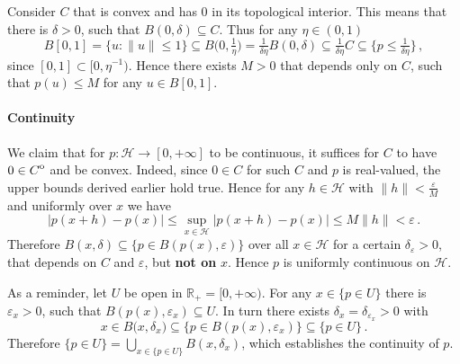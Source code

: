 \documentclass[a4paper]{article}
\newcommand{\Hcal}{\mathcal{H}}
\newcommand{\real}{\mathbb{R}}
\newcommand{\interior}[1]{%
  {\kern0pt#1}^{\mathrm{o}}%
}
\newcommand{\Tcal}{\mathcal{T}}
\begin{document}
Consider $C$ that is convex and has $0$ in its topological interior. This means that
there is $\delta > 0$, such that $B(0, \delta) \subseteq C$. Thus for any $\eta \in
(0, 1)$
\begin{equation*}
  B[0, 1]
    = \{u\colon \|u\| \leq 1\}
    \subseteq B\bigl( 0, \tfrac1\eta \bigr)
    = \tfrac1{\delta \eta} B(0, \delta)
    \subseteq \tfrac1{\delta \eta} C
    \subseteq \bigl\{p \leq \tfrac1{\delta\eta} \bigr\}
    \,,
\end{equation*}
since $[0, 1] \subset [0, \eta^{-1})$. Hence there exists $M > 0$ that depends only
on $C$, such that $p(u) \leq M$ for any $u \in B[0, 1]$.


\paragraph{Continuity} %
\label{par:continuity}

We claim that for $p\colon \Hcal \to [0, +\infty]$ to be continuous, it suffices
for $C$ to have $0\in \interior{C}$ and be convex. Indeed, since $0\in C$ for such
$C$ and $p$ is real-valued, the upper bounds derived earlier hold true. Hence for
any $h \in \Hcal$ with $\|h\| < \tfrac\varepsilon{M}$ and uniformly over $x$ we have
\begin{equation*}
  \bigl\lvert p(x + h) - p(x) \bigr\rvert
    \leq
      \sup_{x\in \Hcal}
        \bigl\lvert p(x + h) - p(x) \bigr\rvert
    \leq M \| h \| < \varepsilon
      \,.
\end{equation*}
Therefore $B(x, \delta) \subseteq \bigl\{ p\in B(p(x), \varepsilon)\bigr\}$ over
all $x\in \Hcal$ for a certain $\delta_\varepsilon > 0$, that depends on $C$ and
$\varepsilon$, but {\bf not on} $x$. Hence $p$ is uniformly continuous on $\Hcal$.

As a reminder, let $U$ be open in $\real_+ = [0, +\infty)$. For any $x\in \{p\in U\}$
there is $\varepsilon_x > 0$, such that $B(p(x), \varepsilon_x) \subseteq U$. In
turn there exists $\delta_x = \delta_{\varepsilon_x} > 0$ with
\begin{equation*}
  x \in B\bigl(x, \delta_x\bigr)
    \subseteq \bigl\{ p\in B(p(x), \varepsilon_x)\bigr\}
    \subseteq \{ p \in U \}
    \,.
\end{equation*}
Therefore $\{ p \in U \} = \bigcup_{x\in \{ p \in U \}} B(x, \delta_x)$, which
establishes the continuity of $p$.
\end{document}
